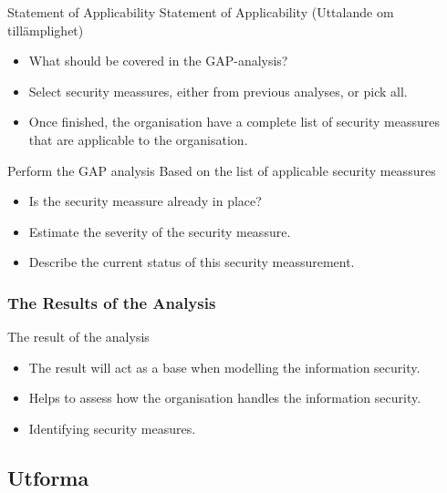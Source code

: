 \documentclass{beamer}
\begin{document}
\begin{frame}{Statement of Applicability}{\insertsubsubsectionhead}
  Statement of Applicability (Uttalande om tillämplighet)
  \begin{itemize}
    \item What should be covered in the GAP-analysis?
    \item Select security meassures, either from previous analyses, or pick all.  
    \item Once finished, the organisation have a complete list of security
      meassures that are applicable to the organisation.
  \end{itemize}
\end{frame}
\begin{frame}{Perform the GAP analysis}{\insertsubsubsectionhead}
  Based on the list of applicable security meassures
  \begin{itemize}
    \item Is the security meassure already in place?
    \item Estimate the severity of the security meassure.
    \item Describe the current status of this security meassurement.
  \end{itemize}
\end{frame}
\subsubsection{The Results of the Analysis}
\begin{frame}{The result of the analysis}{\insertsubsubsectionhead}
  \begin{itemize}
    \item The result will act as a base when modelling the information security.
    \item Helps to assess how the organisation handles the information security.
    \item Identifying security measures.
  \end{itemize}
  
\end{frame}

\subsection{Utforma}
\end{document}
